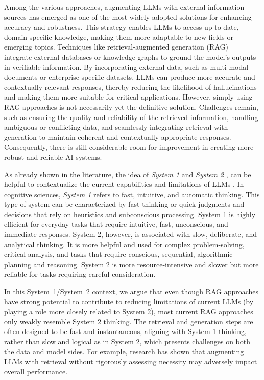 Among the various approaches, augmenting LLMs with external information sources has emerged as one of the most widely adopted solutions for enhancing accuracy and robustness. 
This strategy enables LLMs to access up-to-date, domain-specific knowledge, making them more adaptable to new fields or emerging topics. 
Techniques like retrieval-augmented generation (RAG)~\cite{lewis2020retrieval} integrate external databases or knowledge graphs to ground the model's outputs in verifiable information. 
By incorporating external data, such as multi-modal documents or enterprise-specific datasets, LLMs can produce more accurate and contextually relevant responses, thereby reducing the likelihood of hallucinations and making them more suitable for critical applications. However, simply using RAG approaches is not necessarily yet the definitive solution. Challenges remain, such as ensuring the quality and reliability of the retrieved information, handling ambiguous or conflicting data, and seamlessly integrating retrieval with generation to maintain coherent and contextually appropriate responses. Consequently, there is still considerable room for improvement in creating more robust and reliable AI systems.



As already shown in the literature, the idea of \emph{System 1} and \emph{System 2} \cite{kahneman_thinking_2012},  can be helpful to contextualize the current capabilities and limitations of LLMs \cite{bengio2019system}. In cognitive sciences, \emph{System 1} refers to fast, intuitive, and automatic thinking. This type of system can be characterized by fast thinking or quick judgments and decisions that rely on heuristics and subconscious processing. System 1 is highly efficient for everyday tasks that require intuitive, fast, unconscious, and immediate responses.
System 2, however, is associated with slow, deliberate, and analytical thinking. It is more helpful and used for complex problem-solving, critical analysis, and tasks that require conscious, sequential, algorithmic planning and reasoning. System 2 is more resource-intensive and slower but more reliable for tasks requiring careful consideration. 

In this System~1/System~2 context, we argue that even though RAG approaches have strong potential to contribute to reducing limitations of current LLMs (by playing a role more closely related to System 2), most current RAG approaches only weakly resemble System 2 thinking. The retrieval and generation steps are often designed to be fast and instantaneous, aligning with System 1 thinking, rather than slow and logical as in System 2, which presents challenges on both the data and model sides. For example, research \cite{maekawa-etal-2024-retrieval,ding2024retrieve} has shown that augmenting LLMs with retrieval without rigorously assessing necessity may adversely impact overall performance. 



